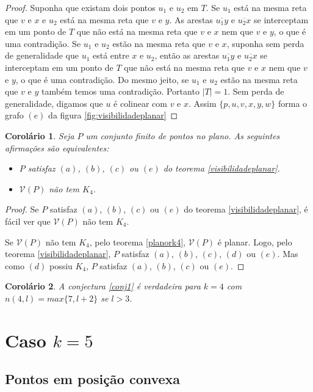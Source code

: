 \documentclass[a4paper]{book}
\newtheorem{corolario}{Corolário}[teorema]
\begin{document}
\begin{proof}
    Suponha que existam dois pontos $u_1$ e $u_2$ em $T$. Se $u_1$ está na mesma reta que $v$ e $x$ e $u_2$ está na mesma reta que $v$ e $y$. As arestas $\overline{u_1y}$ e $\overline{u_2x}$ se interceptam em um ponto de $T$ que não está na mesma reta que $v$ e $x$ nem que $v$ e $y$, o que é uma contradição. Se $u_1$ e $u_2$ estão na mesma reta que $v$ e $x$, suponha sem perda de generalidade que $u_1$ está entre $x$ e $u_2$, então as arestas $\overline{u_1y}$ e $\overline{u_2x}$ se interceptam em um ponto de $T$ que não está na mesma reta que $v$ e $x$ nem que $v$ e $y$, o que é uma contradição. Do mesmo jeito, se $u_1$ e $u_2$ estão na mesma reta que $v$ e $y$ também temos uma contradição. Portanto $|T|=1$. Sem perda de generalidade, digamos que $u$ é colinear com $v$ e $x$. Assim $\{p,u,v,x,y,w\}$ forma o grafo $(e)$ da figura \ref{fig:visibilidadeplanar}
\end{proof}
\begin{corolario}
    Seja $P$ um conjunto finito de pontos no plano. As seguintes afirmações são equivalentes:
    \begin{itemize}
        \item
            $P$ satisfaz $(a)$, $(b)$, $(c)$ ou $(e)$ do teorema \ref{visibilidadeplanar}.
        \item
            $\mathcal V(P)$ não tem $K_4$.
    \end{itemize}
\end{corolario}
\begin{proof}
    Se $P$ satisfaz $(a)$, $(b)$, $(c)$ ou $(e)$ do teorema \ref{visibilidadeplanar}, é fácil ver que $\mathcal V(P)$ não tem $K_4$.

    Se $\mathcal V(P)$ não tem $K_4$, pelo teorema \ref{planork4}, $\mathcal V(P)$ é planar. Logo, pelo teorema \ref{visibilidadeplanar}, $P$ satisfaz $(a)$, $(b)$, $(c)$, $(d)$ ou $(e)$. Mas como $(d)$ possiu $K_4$, $P$ satisfaz $(a)$, $(b)$, $(c)$ ou $(e)$.
\end{proof}

\begin{corolario}
    A conjectura \ref{conj1} é verdadeira para $k=4$ com $n(4,l)=max\{7,l+2\}$ se $l>3$.
\end{corolario}

\section{Caso $k=5$}
\subsection{Pontos em posição convexa}
\cite{pentagon}
\end{document}
